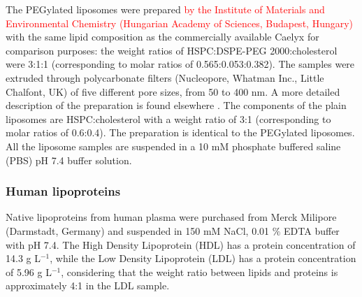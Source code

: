 The PEGylated liposomes were prepared \textcolor{red}{by the Institute of Materials and Environmental Chemistry (Hungarian Academy of Sciences, Budapest, Hungary)} with the same lipid composition as the commercially available Caelyx for comparison purposes: the weight ratios of HSPC:DSPE-PEG 2000:cholesterol were 3:1:1 (corresponding to molar ratios of 0.565:0.053:0.382). The samples were extruded through polycarbonate filters (Nucleopore, Whatman Inc., Little Chalfont, UK) of five different pore sizes, from 50 to 400 nm. A more detailed description of the preparation is found elsewhere \citep{varga_osmotic_2014}. The components of the plain liposomes are HSPC:cholesterol with a weight ratio of 3:1 (corresponding to molar ratios of 0.6:0.4). The preparation is identical to the PEGylated liposomes. All the liposome samples are suspended in a 10 mM phosphate buffered saline (PBS) pH 7.4 buffer solution.

\subsubsection{Human lipoproteins}

Native lipoproteins from human plasma were purchased from Merck Milipore (Darmstadt, Germany) and suspended in 150 mM NaCl, 0.01 $\%$ EDTA buffer with pH 7.4. The High Density Lipoprotein (HDL) has a protein concentration of 14.3 g L$^{-1}$, while the Low Density Lipoprotein (LDL) has a protein concentration of 5.96 g L$^{-1}$, considering that the weight ratio between lipids and proteins is approximately 4:1 in the LDL sample. 

%		


